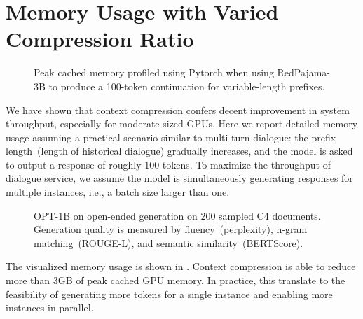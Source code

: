 \section{Memory Usage with Varied Compression Ratio}
\begin{figure}[th]
	\centering
	\caption{Peak cached memory profiled using Pytorch when using RedPajama-3B to produce a 100-token continuation for variable-length prefixes.}
	\label{fig:memory}
\end{figure}
We have shown that context compression confers decent improvement in system throughput, especially for moderate-sized GPUs. Here we report detailed memory usage assuming a practical scenario similar to multi-turn dialogue: the 
prefix length~(length of historical dialogue) gradually increases, and the model is asked to output a response of roughly 100 tokens. To maximize the throughput of dialogue service, we assume the model is simultaneously generating responses for multiple instances, i.e., a batch size larger than one.

\begin{figure}[th]
	\centering
	\caption{OPT-1B on open-ended generation on 200 sampled C4 documents. Generation quality is measured by fluency~(perplexity), n-gram matching~(ROUGE-L), and semantic similarity~(BERTScore).}
	\label{fig:opt1ball}
\end{figure}
The visualized memory usage is shown in . Context compression is able to reduce more than 3GB of peak cached GPU memory. In practice, this translate to the feasibility of generating more tokens for a single instance and enabling more instances in parallel.
